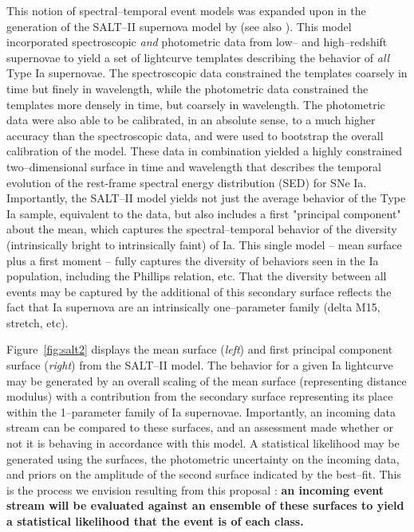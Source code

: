 This notion of spectral--temporal event models was expanded upon in the
generation of the SALT--II supernova model by \cite{2007A&A...466...11G} (see
also \cite{2007ApJ...663.1187H}).  This model incorporated spectroscopic {\it
and} photometric data from low-- and high--redshift supernovae to yield a set of
lightcurve templates describing the behavior of {\it all} Type Ia supernovae.
The spectroscopic data constrained the templates coarsely in time but finely in
wavelength, while the photometric data constrained the templates more densely in
time, but coarsely in wavelength.  The photometric data were also able to be
calibrated, in an absolute sense, to a much higher accuracy than the
spectroscopic data, and were used to bootstrap the overall calibration of the
model.  These data in combination yielded a highly constrained two--dimensional
surface in time and wavelength that describes the temporal evolution of the
rest-frame spectral energy distribution (SED) for SNe Ia. Importantly, the
SALT--II model yields not just the average behavior of the Type Ia sample,
equivalent to the \cite{2002PASP..114..803N} data, but also includes a first
"principal component" about the mean, which captures the spectral--temporal
behavior of the diversity (intrinsically bright to intrinsically faint) of Ia.
This single model -- mean surface plus a first moment -- fully captures the
diversity of behaviors seen in the Ia population, including the Phillips
relation, etc.  That the diversity between all events may be captured by the
additional of this secondary surface reflects the fact that Ia supernova are an
intrinsically one--parameter family (delta M15, stretch, etc).

Figure~\ref{fig:salt2} displays the mean surface ({\it left}) and first
principal component surface ({\it right}) from the SALT--II model.  The behavior
for a given Ia lightcurve may be generated by an overall scaling of the mean
surface (representing distance modulus) with a contribution from the secondary
surface representing its place within the 1--parameter family of Ia supernovae.
Importantly, an incoming data stream can be compared to these surfaces, and an
assessment made whether or not it is behaving in accordance with this model.  A
statistical likelihood may be generated using the surfaces, the photometric
uncertainty on the incoming data, and priors on the amplitude of the second
surface indicated by the best--fit.  This is the process we envision resulting
from this proposal : {\bf an incoming event stream will be evaluated against an
ensemble of these surfaces to yield a statistical likelihood that the event is
of each class.}


